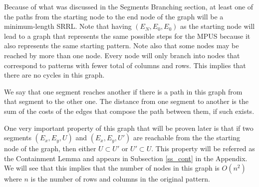 Because of what was discussed in the Segments Branching section, at least one of the paths from the starting node to the end node of the graph will be a minimum-length SRRL.
 Note that having $(E_{N}, E_{0}, E_{0})$ as the starting node will lead to a graph that represents the same possible steps for the MPUS because it also represents the same starting pattern. Note also that some nodes may be reached by more than one node. Every node will only branch into nodes that correspond to patterns with fewer total of columns and rows. This implies that there are no cycles in this graph.

We say that one segment reaches another if there is a path in this graph from that segment to the other one. The distance from one segment to another is the sum of the costs of the edges that compose the path between them, if such exists.

One very important property of this graph that will be proven later is that if two segments $(E_{x}, E_{y}, U)$ and $(E_{x}, E_{y}, U')$ are reachable from the the starting node of the graph, then either $U \subset U'$ or $U' \subset U$. This property will be referred as the Containment Lemma and appears
in Subsection \ref{ss_cont} in the Appendix. We will see that this implies that the number of nodes in this graph is $O(n^{2})$ where $n$ is the number of rows and columns in the original pattern.

